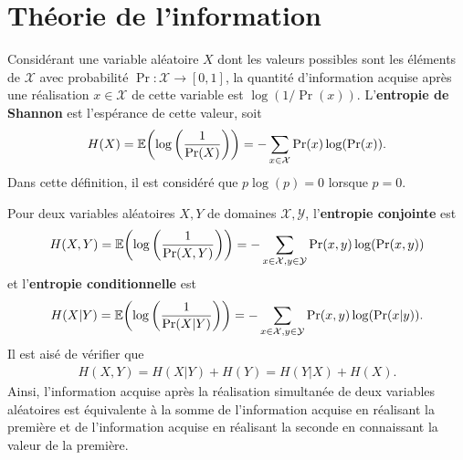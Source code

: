 \begin{comment}
\end{comment}

\appendix

\chapter{Théorie de l'information}
\label{chap:theo_info}

Considérant une variable aléatoire $X$ dont les valeurs possibles sont les éléments de $\mathcal X$
avec probabilité $\Pr: \mathcal X \to [0, 1]$,
la quantité d'information acquise après une réalisation $x \in \mathcal X$ de cette variable
est $\log(1/\Pr(x))$.
L'\textbf{entropie de Shannon} est l'espérance de cette valeur, soit 
\begin{align}
  H(X) = \mathbb E\qty(\log\qty(\frac{1}{\Pr(X)})) = -\sum_{x\in\mathcal X}\Pr(x) \log(\Pr (x)).
\end{align}
Dans cette définition,
il est considéré que $p\log(p) = 0$ lorsque $p = 0$.

Pour deux variables aléatoires $X, Y$ de domaines $\mathcal X, \mathcal Y$,
l'\textbf{entropie conjointe} est 
\begin{align}
  H(X, Y) 
  = \mathbb E\qty(\log\qty(\frac{1}{\Pr(X, Y)})) 
  = -\sum_{x\in\mathcal X, y \in\mathcal Y}\Pr(x, y) \log(\Pr(x, y))
\end{align}
et l'\textbf{entropie conditionnelle} est
\begin{align}
  H(X | Y) 
  = \mathbb E\qty(\log\qty(\frac{1}{\Pr(X|Y)})) 
  = -\sum_{x\in\mathcal X, y \in\mathcal Y}\Pr(x, y) \log(\Pr(x|y)).
\end{align}
Il est aisé de vérifier que 
\begin{align}
  H(X, Y) = H(X | Y) + H(Y) = H(Y | X) + H(X).
\end{align}
Ainsi,
l'information acquise après la réalisation simultanée de deux variables aléatoires
est équivalente à la somme de l'information acquise en réalisant la première 
et de l'information acquise en réalisant la seconde en connaissant la valeur de la première.

